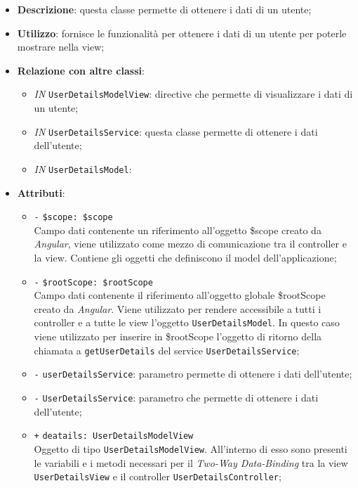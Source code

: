 \begin{itemize}
	\item \textbf{Descrizione}: questa classe permette di ottenere i dati di un utente;
	\item \textbf{Utilizzo}: fornisce le funzionalità per ottenere i dati di un utente per poterle mostrare nella view;
	\item \textbf{Relazione con altre classi}:
	\begin{itemize}
		\item \textit{IN} \texttt{UserDetailsModelView}: directive che permette di visualizzare i dati di un utente; 
		\item \textit{IN} \texttt{UserDetailsService}: questa classe permette di ottenere i dati dell'utente;
		\item \textit{IN} \texttt{UserDetailsModel}: 
	\end{itemize}
	\item \textbf{Attributi}:
	\begin{itemize}
		\item \texttt{-} \texttt{\$scope: \$scope} \\
		Campo dati contenente un riferimento all’oggetto \$scope creato da \textit{Angular}, viene utilizzato come mezzo di comunicazione tra il controller e la view. Contiene gli oggetti che definiscono il model dell’applicazione;
		\item \texttt{-} \texttt{\$rootScope: \$rootScope} \\
		Campo dati contenente il riferimento all'oggetto globale \$rootScope creato da \textit{Angular}. Viene utilizzato per rendere accessibile a tutti i controller e a tutte le view l'oggetto \texttt{UserDetailsModel}. In questo caso viene utilizzato per inserire in \$rootScope l'oggetto di ritorno della chiamata a \texttt{getUserDetails} del service \texttt{UserDetailsService};
		\item \texttt{-} \texttt{userDetailsService}: parametro permette di ottenere i dati dell'utente;
		\item \texttt{-} \texttt{UserDetailsService}: parametro che permette di ottenere i dati dell'utente;
		\item \texttt{+} \texttt{deatails: UserDetailsModelView} \\
		Oggetto di tipo \texttt{UserDetailsModelView}. All'interno di esso sono presenti le variabili e i metodi necessari per il \textit{Two-Way Data-Binding} tra la view \texttt{UserDetailsView} e il controller \texttt{UserDetailsController};
	\end{itemize}	

\end{itemize}
